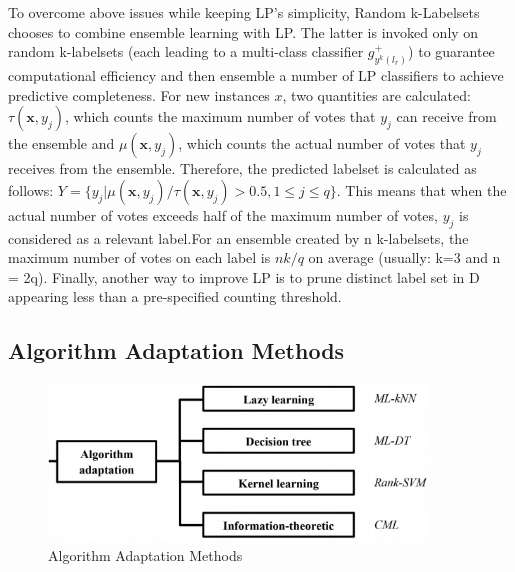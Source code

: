 \documentclass[12pt]{report}
\begin{document}
	To overcome above issues while keeping LP's simplicity, Random k-Labelsets chooses to combine ensemble learning with LP. The latter is invoked only on random k-labelsets (each leading to a multi-class classifier $g_{y^k(l_r)}^+$) to guarantee computational efficiency and then ensemble a number of LP classifiers to achieve predictive completeness. For new instances $x$, two quantities are calculated: $\tau(\textbf{x},y_j)$, which counts the maximum number of votes that $y_j$ can receive from the ensemble and $\mu(\textbf{x},y_j)$, which counts the actual number of votes that $y_j$ receives from the ensemble. Therefore, the predicted labelset is calculated as follows: $Y = \{y_j|\mu(\textbf{x},y_j)/\tau(\textbf{x},y_j)>0.5,  1 \leq j \leq q\}$. This means that when the actual number of votes exceeds half of the maximum number of votes, $y_j$ is considered as a relevant label.For an ensemble created by n k-labelsets, the maximum number of votes on each label is $nk/q$ on average (usually: k=3 and n = 2q). Finally, another way to improve LP is to prune distinct label set in D appearing less than a pre-specified counting threshold.
	
	\subsection*{Algorithm Adaptation Methods}
	
	\begin{figure}[H]
		\centering
		\includegraphics[width=0.9\textwidth]{aa.png}
		\caption{Algorithm Adaptation Methods}
		\centering
	\end{figure}
\end{document}

